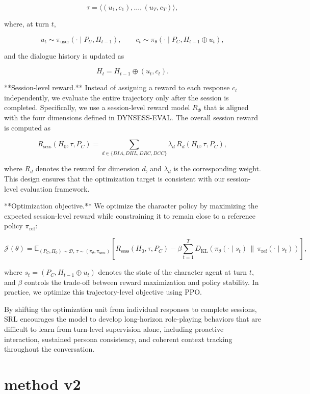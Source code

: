 \[
\tau = \langle (u_1, c_1), \ldots, (u_T, c_T) \rangle,
\]

where, at turn \(t\),

\[
u_t \sim \pi_{\mathrm{user}}(\cdot \mid P_U, H_{t-1}), \qquad
c_t \sim \pi_\theta(\cdot \mid P_C, H_{t-1} \oplus u_t),
\]

and the dialogue history is updated as

\[
H_t = H_{t-1} \oplus (u_t, c_t).
\]

**Session-level reward.**  
Instead of assigning a reward to each response \(c_t\) independently, we evaluate the entire trajectory only after the session is completed. Specifically, we use a session-level reward model \(R_\Phi\) that is aligned with the four dimensions defined in DYNSESS-EVAL. The overall session reward is computed as

\[
R_{\mathrm{sess}}(H_0, \tau, P_C)
=
\sum_{d \in \{DIA, DHL, DRC, DCC\}}
\lambda_d \, R_d(H_0, \tau, P_C),
\]

where \(R_d\) denotes the reward for dimension \(d\), and \(\lambda_d\) is the corresponding weight. This design ensures that the optimization target is consistent with our session-level evaluation framework.

**Optimization objective.**  
We optimize the character policy by maximizing the expected session-level reward while constraining it to remain close to a reference policy \(\pi_{\mathrm{ref}}\):

\[
\mathcal{J}(\theta)
=
\mathbb{E}_{(P_C, H_0) \sim \mathcal{D},\,
\tau \sim (\pi_\theta, \pi_{\mathrm{user}})}
\left[
R_{\mathrm{sess}}(H_0, \tau, P_C)
-
\beta \sum_{t=1}^{T}
D_{\mathrm{KL}}\!\left(
\pi_\theta(\cdot \mid s_t)\,\|\,\pi_{\mathrm{ref}}(\cdot \mid s_t)
\right)
\right],
\]

where \(s_t = (P_C, H_{t-1} \oplus u_t)\) denotes the state of the character agent at turn \(t\), and \(\beta\) controls the trade-off between reward maximization and policy stability. In practice, we optimize this trajectory-level objective using PPO.

By shifting the optimization unit from individual responses to complete sessions, SRL encourages the model to develop long-horizon role-playing behaviors that are difficult to learn from turn-level supervision alone, including proactive interaction, sustained persona consistency, and coherent context tracking throughout the conversation.



\section{method v2 }





